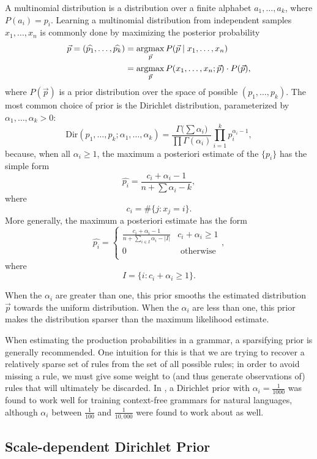 \documentclass{article}
\begin{document}
A multinomial distribution is a distribution over a finite alphabet
$a_1,\dots, a_k$, where $P(a_i)=p_i$. Learning a multinomial
distribution from independent samples $x_1,\dots, x_n$ is commonly done by
maximizing the posterior probability 
\begin{align*}
\vec{p} = (\widehat{p_1},\dots, \widehat{p_k}) &= \operatorname*{argmax}_{\vec{p}}
P(\vec{p} \mid x_1,\dots,x_n )\\
&= \operatorname*{argmax}_{\vec{p}} P(x_1,\dots,x_n; \vec{p}) \cdot P(\vec{p}),
\end{align*}
where $P(\vec{p})$ is a prior distribution over the space of possible
$(p_1,\dots,p_k)$. The most common choice of prior is the Dirichlet
distribution, parameterized by $\alpha_1,\dots, \alpha_k > 0$:
$$\mathrm{Dir}(p_1,\dots, p_k; \alpha_1,\dots, \alpha_k) = \frac{\Gamma\bigl(\sum \alpha_i\bigr)}{\prod \Gamma(\alpha_i)} \prod_{i=1}^k p_i^{\alpha_i - 1},$$
because, when all $\alpha_i \ge 1$, the maximum a posteriori estimate of the $\{p_i\}$ has the simple form
$$\widehat{p_i} = \frac{ c_i + \alpha_i - 1}{ n + \sum
  \alpha_i - k},$$ 
where
$$c_i = \#\{j : x_j = i\}.$$
More generally, the maximum a posteriori estimate has the form
$$\widehat{p_i} = \begin{cases}
\frac{ c_i + \alpha_i - 1}{ n + \sum_{i\in I} \alpha_i - |I|} & c_i + \alpha_i \ge 1\\
0 & \mbox{ otherwise}\\
\end{cases},$$ 
where
$$I = \{i : c_i + \alpha_i \ge 1\}.$$

When the $\alpha_i$ are greater than one, this prior smooths the
estimated distribution $\vec{p}$ towards the uniform
distribution. When the $\alpha_i$ are less than one, this prior makes
the distribution sparser than the maximum likelihood estimate. 

When estimating the production probabilities in a grammar, a
sparsifying prior is generally recommended. One intuition for this is
that we are trying to recover a relatively sparse set of rules from
the set of all possible rules; in order to avoid missing a rule, we
must give some weight to (and thus generate observations of) rules
that will ultimately be discarded. In \cite{johnson-naacl}, a
Dirichlet prior with $\alpha_i = \frac{1}{1000}$ was found to work
well for training context-free grammars for natural languages,
although $\alpha_i$ between $\frac{1}{100}$ and $\frac{1}{10,000}$
were found to work about as well.

\subsection{Scale-dependent Dirichlet Prior}
\label{sec-scale}
\end{document}
